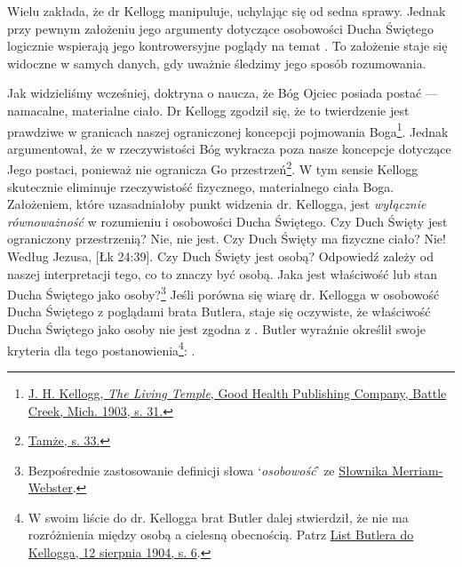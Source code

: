 Wielu zakłada, że dr Kellogg manipuluje, uchylając się od sedna sprawy. Jednak przy pewnym założeniu jego argumenty dotyczące osobowości Ducha Świętego logicznie wspierają jego kontrowersyjne poglądy na temat . To założenie staje się widoczne w samych danych, gdy uważnie śledzimy jego sposób rozumowania.

Jak widzieliśmy wcześniej, doktryna o  naucza, że Bóg Ojciec posiada postać — namacalne, materialne ciało. Dr Kellogg zgodził się, że to twierdzenie jest prawdziwe w granicach naszej ograniczonej koncepcji pojmowania Boga\footnote{\href{https://archive.org/details/J.H.Kellogg.TheLivingTemple1903/page/n33/}{J. H. Kellogg, \textit{The Living Temple}, Good Health Publishing Company, Battle Creek, Mich. 1903, s. 31.}}. Jednak argumentował, że w rzeczywistości Bóg wykracza poza nasze koncepcje dotyczące Jego postaci, ponieważ nie ogranicza Go przestrzeń\footnote{\href{https://archive.org/details/J.H.Kellogg.TheLivingTemple1903/page/n33/}{Tamże, s. 33.}}. W tym sensie Kellogg skutecznie eliminuje rzeczywistość fizycznego, materialnego ciała Boga. Założeniem, które uzasadniałoby punkt widzenia dr. Kellogga, jest \textit{wyłącznie równoważność} w rozumieniu  i osobowości Ducha Świętego. Czy Duch Święty jest ograniczony przestrzenią? Nie, nie jest. Czy Duch Święty ma fizyczne ciało? Nie! Według Jezusa, [Łk 24:39]. Czy Duch Święty jest osobą? Odpowiedź zależy od naszej interpretacji tego, co to znaczy być osobą. Jaka jest właściwość lub stan Ducha Świętego jako osoby?\footnote{Bezpośrednie zastosowanie definicji słowa ‘\textit{osobowość}’ ze \href{https://www.merriam-webster.com/dictionary/personality}{Słownika Merriam-Webster}.} Jeśli porówna się wiarę dr. Kellogga w osobowość Ducha Świętego z poglądami brata Butlera, staje się oczywiste, że właściwość Ducha Świętego jako osoby nie jest zgodna z . Butler wyraźnie określił swoje kryteria dla tego postanowienia\footnote{W swoim liście do dr. Kellogga brat Butler dalej stwierdził, że nie ma rozróżnienia między osobą a cielesną obecnością. Patrz \href{https://c7da.us/egwdl/Butler\%20to\%20Kellogg\%20Aug121904.pdf}{List Butlera do Kellogga, 12 sierpnia 1904, s. 6}.}: .

